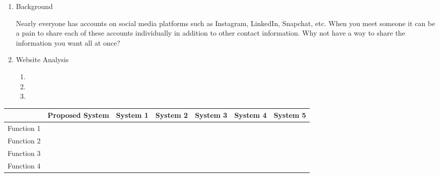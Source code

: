 \documentclass[12pt]{article}%
\begin{document}
\begin{enumerate}

    \item Background
    
    Nearly everyone has accounts on social media platforms such as Instagram, LinkedIn, Snapchat, etc. When you meet someone it can 
    be a pain to share each of these accounts individually in addition to other contact information. Why not have a way to share the 
    information you want all at once? 
    
    
    \item Website Analysis
        \begin{enumerate}
            \item 
            \item 
            \item
        \end{enumerate}
\end{enumerate}

\begin{center}
    \begin{tabular}{|l|l|l|l|l|l|l|}
        \hline
         & Proposed System & System 1 & System 2 & System 3 & System 4 & System 5 \\
         \hline
        Function 1 & & & & & & \\
        \hline
        Function 2 & & & & & & \\
        \hline
        Function 3 & & & & & & \\
        \hline
        Function 4 & & & & & & \\
         \hline
    \end{tabular}
\end{center}

\end{document}
